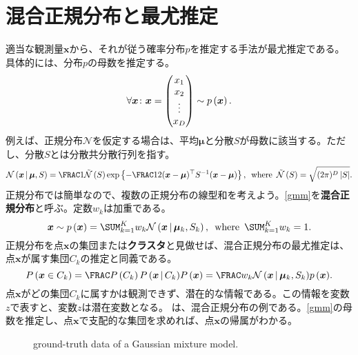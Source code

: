 \documentclass[10pt,a4paper]{book}
\begin{document}
\chapter{混合正規分布と最尤推定\label{chap:gmm}}

適当な観測量$\bm{x}$から、それが従う確率分布$p$を推定する手法が最尤推定である。具体的には、分布$p$の母数を推定する。
%
\begin{equation}
\forall\bm{x}\colon \bm{x} =
\begin{pmatrix}
x_1\\
x_2\\
\vdots\\
x_D
\end{pmatrix}
\sim \prob{\bm{x}}.
\end{equation}
%
例えば、正規分布$\mathcal{N}$を仮定する場合は、平均$\bm{\mu}$と分散$S$が母数に該当する。ただし、分散$S$とは分散共分散行列を指す。
%
\begin{equation}
\label{eq:gmm:n}
\Nd{\bm{x}}{\bm{\mu},S} =
\frac{1}{\Nn{S}} \exp \seq{-\frac{1}{2} \trans{(\bm{x}-\bm{\mu})} S^{-1} (\bm{x}-\bm{\mu})},
\where
\Nn{S} = \sqrt{(2\pi)^D\abs{S}}.
\end{equation}
%
正規分布では簡単なので、複数の正規分布の線型和を考えよう。\eqref{gmm}を\textbf{混合正規分布}と呼ぶ。定数$w_k$は加重である。
%
\begin{equation}
\label{eq:gmm}
\bm{x} \sim \prob{\bm{x}} = \sum_{k=1}^K w_k \Nd{\bm{x}}{\bm{\mu}_k,S_k},
\where
\sum_{k=1}^K w_k = 1.
\end{equation}
%
正規分布を点$\bm{x}$の集団または\textbf{クラスタ}と見做せば、混合正規分布の最尤推定は、点$\bm{x}$が属す集団$C_k$の推定と同義である。
%
\begin{equation}
\Prob{\bm{x} \in C_k} =
\frac{\Prob{C_k}\Prob{\bm{x}}[C_k]}{\Prob{\bm{x}}} =
\frac{w_k \Nd{\bm{x}}{\bm{\mu}_k,S_k}}{\prob{\bm{x}}}.
\end{equation}
%
点$\bm{x}$がどの集団$C_k$に属すかは観測できず、潜在的な情報である。この情報を変数$z$で表すと、変数$z$は潜在変数となる。
は、混合正規分布の例である。\eqref{gmm}の母数を推定し、点$\bm{x}$で支配的な集団を求めれば、点$\bm{x}$の帰属がわかる。

\begin{figure}[h]
\centering
{}
\caption{ground-truth data of a Gaussian mixture model.\label{fig:gmm}}
\end{figure}
\end{document}
